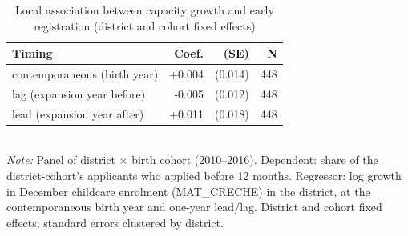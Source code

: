 \begin{table}[htbp]\centering
\caption{Local association between capacity growth and early registration (district and cohort fixed effects)}
\label{tab:C6}
\footnotesize
\setlength{\tabcolsep}{4pt}
\begin{tabular}{lrrr}
\toprule
Timing & Coef. & (SE) & N \\
\midrule
contemporaneous (birth year) & +0.004 & (0.014) & 448 \\
lag (expansion year before) & -0.005 & (0.012) & 448 \\
lead (expansion year after) & +0.011 & (0.018) & 448 \\
\bottomrule
\end{tabular}
\\[3pt]{\footnotesize \textit{Note:} Panel of district $\times$ birth cohort (2010--2016). Dependent: share of the district-cohort's applicants who applied before 12 months. Regressor: log growth in December childcare enrolment (MAT\_CRECHE) in the district, at the contemporaneous birth year and one-year lead/lag. District and cohort fixed effects; standard errors clustered by district.}
\end{table}
